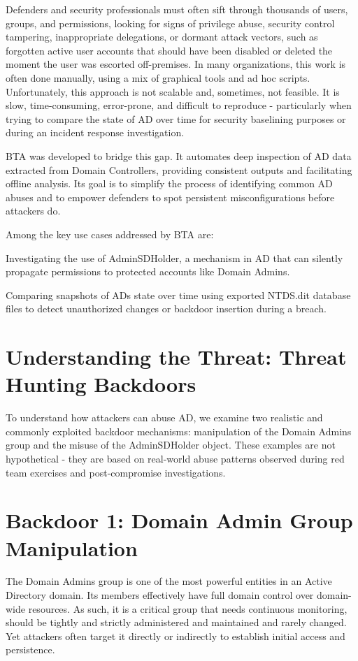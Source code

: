 Defenders and security professionals must often sift through thousands of users, groups, and permissions, looking for signs of privilege abuse, security control tampering, inappropriate delegations, or dormant attack vectors, such as forgotten active user accounts that should have been disabled or deleted the moment the user was escorted off-premises. In many organizations, this work is often done manually, using a mix of graphical tools and ad hoc scripts. Unfortunately, this approach is not scalable and, sometimes, not feasible. It is slow, time-consuming, error-prone, and difficult to reproduce - particularly when trying to compare the state of AD over time for security baselining purposes or during an incident response investigation.

BTA was developed to bridge this gap. It automates deep inspection of AD data extracted from Domain Controllers, providing consistent outputs and facilitating offline analysis. Its goal is to simplify the process of identifying common AD abuses and to empower defenders to spot persistent misconfigurations before attackers do.

Among the key use cases addressed by BTA are:
    \item Investigating the use of AdminSDHolder, a mechanism in AD that can silently propagate permissions to protected accounts like Domain Admins.
    \item Comparing snapshots of ADs state over time using exported NTDS.dit database files to detect unauthorized changes or backdoor insertion during a breach.

\section{Understanding the Threat: Threat Hunting Backdoors}
\label{sec:3}

To understand how attackers can abuse AD, we examine two realistic and commonly exploited backdoor mechanisms: manipulation of the Domain Admins group and the misuse of the AdminSDHolder
 object. These examples are not hypothetical - they are based on real-world abuse patterns observed during red team exercises and post-compromise investigations.

\section{Backdoor 1: Domain Admin Group Manipulation}
\label{sec:3.1}
The Domain Admins group is one of the most powerful entities in an Active Directory domain. Its members effectively have full domain control over domain-wide resources. As such, it is a critical group that needs continuous monitoring, should be tightly and strictly administered and maintained and rarely changed. Yet attackers often target it directly or indirectly to establish initial access and persistence.

